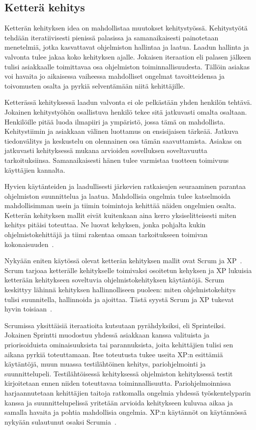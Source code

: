 \documentclass[finnish]{../tktltiki2}
\theoremstyle{definition}
\theoremstyle{remark}
\begin{document}
\subsection{Ketterä kehitys}

Ketterän kehityksen idea on mahdollistaa muutokset kehitystyössä. Kehitystyötä tehdään iteratiivisesti pienissä 
palasissa ja samanaikaisesti painotetaan menetelmiä, jotka kasvattavat ohjelmiston hallintaa ja laatua. Laadun hallinta 
ja valvonta tulee jakaa koko kehityksen ajalle. Jokaisen iteraation eli palasen jälkeen tulisi asiakkaalle toimittavaa 
osa ohjelmiston toiminnallisuudesta. Tällöin asiakas voi havaita jo aikaisessa vaiheessa mahdolliset ongelmat 
tavoitteidensa ja toivomusten osalta ja pyrkiä selventämään niitä kehittäjille.

    Ketterässä kehityksessä laadun valvonta ei ole pelkästään yhden henkilön tehtävä. Jokainen kehitystyöhön osallistuva 
henkilö tekee sitä jatkuvasti omalta osaltaan. Henkilöille pitää luoda ilmapiiri ja ympäristö, jossa tämä on 
mahdollista. Kehitystiimin ja asiakkaan välinen luottamus on ensisijaisen tärkeää. Jatkuva tiedonvälitys ja keskustelu 
on olennainen osa tämän saavuttamista. Asiakas on jatkuvasti kehityksessä mukana arvioiden sovelluksen soveltavuutta 
tarkoituksiinsa. Samanaikaisesti hänen tulee varmistaa tuotteen toimivuus käyttäjien kannalta.

    Hyvien käytänteiden ja laadullisesti järkevien ratkaisujen seuraaminen parantaa ohjelmiston suunnittelua ja laatua. 
Mahdollisia ongelmia tulee katselmoida mahdollisimman usein ja tiimin toimintoja kehittää näiden ongelmien osalta. 
Ketterän kehityksen mallit eivät kuitenkaan aina kerro yksiselitteisesti miten kehitys pitäisi toteuttaa. Ne luovat 
kehyksen, jonka pohjalta kukin ohjelmistokehittäjä ja tiimi rakentaa omaan tarkoitukseen toimivan 
kokonaisuuden~\cite{Kn07}.

    Nykyään eniten käytössä olevat ketterän kehityksen mallit ovat Scrum ja XP~\cite{SS10}. Scrum tarjoaa ketterälle 
kehitykselle toimivaksi osoitetun kehyksen ja XP lukuisia ketterään kehitykseen soveltuvia ohjelmistokehityksen 
käytäntöjä. Scrum keskittyy lähinnä kehityksen hallinnolliseen puoleen: miten ohjelmistokehitys tulisi suunnitella, 
hallinnoida ja ajoittaa. Tästä syystä Scrum ja XP tukevat hyvin toisiaan~\cite{Kn07}.

    Scrumissa yksittäisiä iteraatioita kutsutaan pyrähdyksiksi, eli Sprinteiksi. Jokainen Sprintti muodostuu yhdessä 
asiakkaan kanssa valituista ja priorisoiduista ominaisuuksista tai parannuksista, joita kehittäjien tulisi sen aikana 
pyrkiä toteuttamaan. Itse toteutusta tukee useita XP:n esittämiä käytäntöjä, muun muassa testilähtöinen kehitys, 
pariohjelmointi ja suunnittelupeli. Testilähtöisessä kehityksessä ohjelmiston kehityksessä testit kirjoitetaan ennen 
niiden toteuttavaa toiminnallisuutta. Pariohjelmoinnissa harjaannutetaan kehittäjien taitoja ratkomalla ongelmia yhdessä 
työskentelyparin kanssa ja suunnittelupelissä yritetään arvioida kehitykseen kuluvaa aikaa ja samalla havaita ja pohtia 
mahdollisia ongelmia. XP:n käytännöt on käytännössä nykyään sulautunut osaksi Scrumia~\cite{Kn07}.
\end{document}
